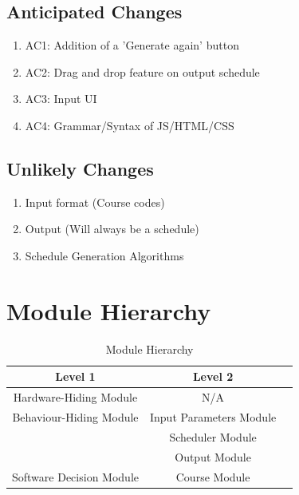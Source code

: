\documentclass[11pt, oneside]{article}
\begin{document}
\subsection{Anticipated Changes}
\begin{enumerate}
    \item AC1: Addition of a 'Generate again' button
    \item AC2: Drag and drop feature on output schedule
    \item AC3: Input UI
    \item AC4: Grammar/Syntax of JS/HTML/CSS 
\end{enumerate}

\subsection{Unlikely Changes}
\begin{enumerate}
    \item Input format (Course codes)
    \item Output (Will always be a schedule)
    \item Schedule Generation Algorithms
\end{enumerate}

\section{Module Hierarchy}

\begin{table}[H]
\begin{center}
\begin{tabular}{|c|c|c|}
\hline
\textbf{Level 1} & \textbf{Level 2}\\
\hline
Hardware-Hiding Module & N/A \\
\hline
Behaviour-Hiding Module & Input Parameters Module \\
& Scheduler Module \\
& Output Module \\
\hline
Software Decision Module & Course Module \\
\hline
\end{tabular}
\end{center}
\label{default}
\caption{Module Hierarchy}
\end{table}%


\newpage
\end{document}

